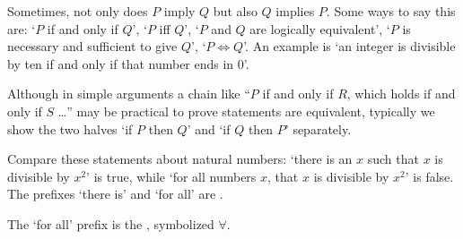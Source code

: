 




Sometimes, not only does \( P \) imply \( Q \) but
also \( Q \) implies \( P \). 
Some ways to say this are:
`\( P \) if and only if
\( Q \)', `\( P \) iff \( Q \)', `\( P \) and \( Q \) are logically
equivalent', `\( P \) is necessary and sufficient to give \( Q \)',
`\( P\iff Q \)'.
An example is `an integer is divisible by ten if and only if  
that number ends in $0$'.

Although in simple arguments a chain like 
``\( P \) if and only if $R$, which holds if and only if $S$ \ldots''
may be practical to prove statements are equivalent, 
typically we show the two halves
`if \( P \) then \( Q \)' and `if \( Q \) then \( P \)' separately.








%
Compare these statements about natural numbers:
`there is an \( x \) such that \( x \) is
divisible by \( x^2 \)' is true, while
`for all numbers \( x \), that \( x \) is divisible by \( x^2 \)' is false.
The prefixes `there is' and `for all' 
are .

The `for all' prefix is the 
, 
symbolized \( \forall \).

